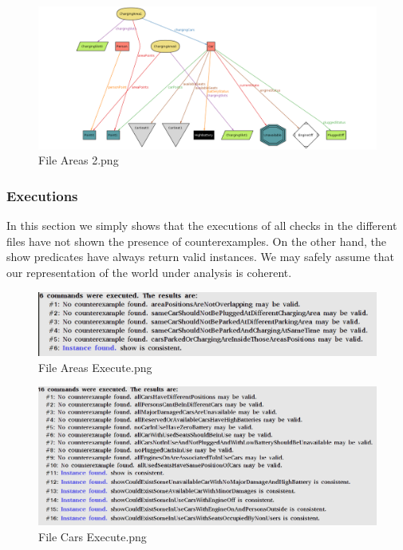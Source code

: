 \FloatBarrier
\begin{figure}[!htbp]
\centering
\includegraphics[width=\linewidth,keepaspectratio]{../Alloy/Exported/Images/Areas_2.png}
\caption{File Areas 2.png}
\label{fig:Area2}
\end{figure}
\FloatBarrier

\subsubsection{Executions}
In this section we simply shows that the executions of all checks in the different files have not shown the presence of counterexamples. On the other hand, the show predicates have always return valid instances. We may safely assume that our representation of the world under analysis is coherent.

\begin{figure}[!htbp]
\centering
\includegraphics[width=\linewidth,keepaspectratio]{../Alloy/Exported/Images/Areas_Execute.png}
\caption{File Areas Execute.png}
\end{figure}
\FloatBarrier
\begin{figure}[!htbp]
\centering
\includegraphics[width=\linewidth,keepaspectratio]{../Alloy/Exported/Images/Cars_Execute.png}
\caption{File Cars Execute.png}
\end{figure}
\FloatBarrier